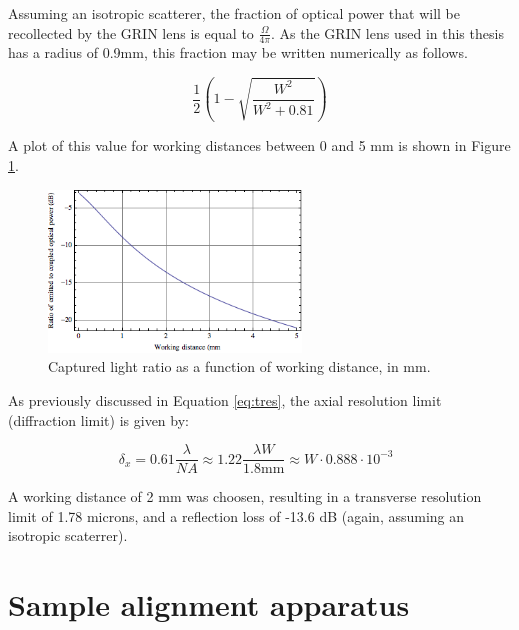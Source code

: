 Assuming an isotropic scatterer, the fraction of optical power that will be recollected by the GRIN lens is equal to $\frac{\Omega}{4 \pi}$. As the GRIN lens used in this thesis has a radius of 0.9mm, this fraction may be written numerically as follows.

\begin{equation}
\frac{1}{2} \left( 1 - \sqrt{\frac{W^2}{W^2 + 0.81}} \right)
\end{equation}

A plot of this value for working distances between 0 and 5 mm is shown in Figure \ref{fig:wd}.

\begin{figure}[h!]
\centering
\includegraphics[width=0.6\textwidth]{Images/System/grin_scattering.png}
\caption{Captured light ratio as a function of working distance, in mm. \label{fig:wd}}
\end{figure}

As previously discussed in Equation \ref{eq:tres}, the axial resolution limit (diffraction limit) is given by:

\begin{equation} \label{eq:tres2}
\delta_x = 0.61 \frac{\lambda}{NA} \approx 1.22 \frac{\lambda W}{1.8 \mathrm{mm}} \approx W \cdot 0.888 \cdot 10^{-3} \;\;
\end{equation}

A working distance of 2 mm was choosen, resulting in a transverse resolution limit of 1.78 microns, and a reflection loss of -13.6 dB (again, assuming an isotropic scaterrer).

\section{Sample alignment apparatus}




